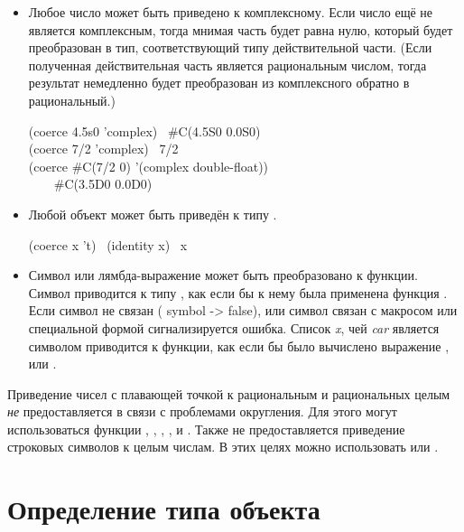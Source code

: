 \begin{defun}[Функция]
\begin{itemize}
\item
  Любое число может быть приведено к комплексному. Если число ещё не является
  комплексным, тогда мнимая часть будет равна нулю, который будет преобразован в
  тип, соответствующий типу действительной части. (Если полученная
  действительная часть является рациональным числом, тогда результат немедленно
  будет преобразован из комплексного обратно в рациональный.)

  \begin{lisp}
    (coerce 4.5s0 'complex) \EV\ \#C(4.5S0 0.0S0) \\
    (coerce 7/2 'complex) \EV\ 7/2 \\
    (coerce \#C(7/2 0) '(complex double-float)) \\
    ~~~\EV\ \#C(3.5D0 0.0D0)
  \end{lisp}

\item
  Любой объект может быть приведён к типу .
  \begin{lisp}
    (coerce x 't) \EQ\ (identity x) \EQ\ x
  \end{lisp}
\end{itemize}

\begin{itemize}
\item
  Символ или лямбда-выражение может быть преобразовано к функции.
  Символ приводится к типу , как если бы к нему была применена
  функция . Если символ не связан ( symbol ->
  false), или символ связан с макросом или специальной формой сигнализируется
  ошибка.
  Список \emph{x}, чей \emph{car} является символом  приводится к
  функции, как если бы было вычислено выражение ,
  или .
\end{itemize}

Приведение чисел с плавающей точкой к рациональным и рациональных целым
\emph{не} предоставляется в связи с проблемами округления. Для этого могут
использоваться функции , ,
, ,  и . Также не предоставляется
приведение строковых символов к целым числам. В этих целях можно использовать
 или .
\end{defun}

\section{Определение типа объекта}

